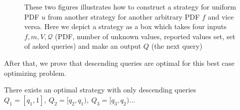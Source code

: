 \begin{figure}
\centering
  \caption{These two figures illustrates how to construct a strategy for
  uniform PDF $u$ from another strategy for another arbitrary PDF $f$ and vice
  versa. Here we depict a strategy as a box which takes four inputs $f, m, V,
  \mathcal Q$ (PDF, number of unknown values, reported values set, set of asked
  queries) and make an output $Q$ (the next query)} \label{fig:uniform}
\end{figure}

After that, we prove that descending queries are optimal for this best
case optimizing problem.

\begin{lemma}\label{lemma:descending}

There exists an optimal strategy with only descending queries
$Q_1 = [q_1, 1], ~Q_2 = [q_2, q_1), ~Q_3 = [q_3, q_2)\ldots$

\end{lemma}

